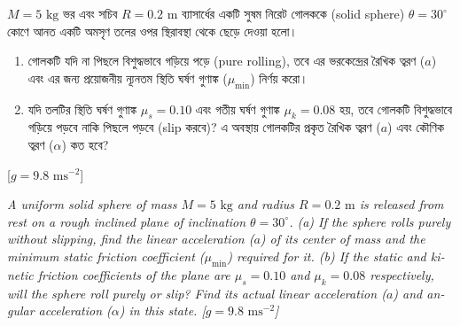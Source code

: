 \documentclass[12pt, a4paper]{article}
\begin{document}
\begin{tcolorbox}[questionbox={প্রশ্ন (Question) 20}]
\noindent
$M = 5\text{ kg}$ ভর এবং সচিব $R = 0.2\text{ m}$ ব্যাসার্ধের একটি সুষম নিরেট গোলককে (solid sphere) $\theta = 30^\circ$ কোণে আনত একটি অমসৃণ তলের ওপর স্থিরাবস্থা থেকে ছেড়ে দেওয়া হলো। 
\begin{enumerate}
    \item[(ক)] গোলকটি যদি না পিছলে বিশুদ্ধভাবে গড়িয়ে পড়ে (pure rolling), তবে এর ভরকেন্দ্রের রৈখিক ত্বরণ ($a$) এবং এর জন্য প্রয়োজনীয় ন্যূনতম স্থিতি ঘর্ষণ গুণাঙ্ক ($\mu_{\min}$) নির্ণয় করো।
    \item[(খ)] যদি তলটির স্থিতি ঘর্ষণ গুণাঙ্ক $\mu_s = 0.10$ এবং গতীয় ঘর্ষণ গুণাঙ্ক $\mu_k = 0.08$ হয়, তবে গোলকটি বিশুদ্ধভাবে গড়িয়ে পড়বে নাকি পিছলে পড়বে (slip করবে)? এ অবস্থায় গোলকটির প্রকৃত রৈখিক ত্বরণ ($a$) এবং কৌণিক ত্বরণ ($\alpha$) কত হবে?
\end{enumerate}
[$g = 9.8\text{ ms}^{-2}$]

\vspace{0.8em}
\begin{english}
\noindent\textit{\color{darkgray}
A uniform solid sphere of mass $M = 5\text{ kg}$ and radius $R = 0.2\text{ m}$ is released from rest on a rough inclined plane of inclination $\theta = 30^\circ$. 
(a) If the sphere rolls purely without slipping, find the linear acceleration ($a$) of its center of mass and the minimum static friction coefficient ($\mu_{\min}$) required for it. 
(b) If the static and kinetic friction coefficients of the plane are $\mu_s = 0.10$ and $\mu_k = 0.08$ respectively, will the sphere roll purely or slip? Find its actual linear acceleration ($a$) and angular acceleration ($\alpha$) in this state. [$g = 9.8\text{ ms}^{-2}$]
}
\end{english}
\end{tcolorbox}

\vspace{1em}
\begin{center}
\end{center}
\vspace{1em}
\end{document}
